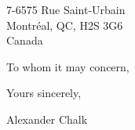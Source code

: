 \documentclass[12pt]{article}
\newcommand{\fromperson}{Alexander Chalk}
\newcommand{\toperson}{To whom it may concern,}
\newcommand{\fromaddress}{
  7-6575 Rue Saint-Urbain\\
  Montréal, QC, H2S 3G6\\
  Canada
}
\begin{document}
\begin{flushright}
  \fromaddress
\end{flushright}

\smallskip

\rightline{\today}

\bigskip

\toperson

\smallskip

\lipsum[1-2] %

\bigskip

Yours sincerely,

\vspace{1\baselineskip}

\fromperson
\end{document}

